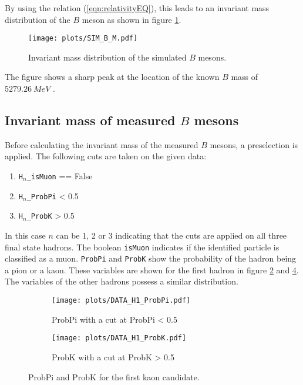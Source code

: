 By using the relation (\ref{eqn:relativityEQ}), this leads to an invariant mass distribution of the $B$ meson as shown in figure \ref{fig:BM}.
\begin{figure}[!htb]
  \centering
  \texttt{[image: plots/SIM\_B\_M.pdf]}
  \caption{Invariant mass distribution of the simulated $B$ mesons.}
  \label{fig:BM}
\end{figure}
The figure shows a sharp peak at the location of the known $B$ mass of $\SI{5279.26}{MeV}$ \cite{pdg}.

\subsection{Invariant mass of measured $B$ mesons}
Before calculating the invariant mass of the measured $B$ mesons, a preselection is applied.
The following cuts are taken on the given data:
\begin{enumerate}
  \item \texttt{H$_n$\_isMuon} == False
  \item \texttt{H$_n$\_ProbPi} < 0.5
  \item \texttt{H$_n$\_ProbK} > 0.5
\end{enumerate}
In this case $n$ can be 1, 2 or 3 indicating that the cuts are applied on all three final state hadrons.
The boolean \texttt{isMuon} indicates if the identified particle is classified as a muon.
\texttt{ProbPi} and \texttt{ProbK} show the probability of the hadron being a pion or a kaon.
These variables are shown for the first hadron in figure \ref{fig:ProbPi} and \ref{fig:ProbK}.
The variables of the other hadrons possess a similar distribution.

\begin{figure}[!htb]
\centering
\begin{subfigure}{0.49\textwidth}
  \texttt{[image: plots/DATA\_H1\_ProbPi.pdf]}
  \caption{ProbPi with a cut at ProbPi < 0.5}
  \label{fig:ProbPi}
\end{subfigure}
\begin{subfigure}{0.49\textwidth}
  \texttt{[image: plots/DATA\_H1\_ProbK.pdf]}
  \caption{ProbK with a cut at ProbK > 0.5}
  \label{fig:ProbK}
\end{subfigure}
\caption{ProbPi and ProbK for the first kaon candidate.}
\end{figure}

